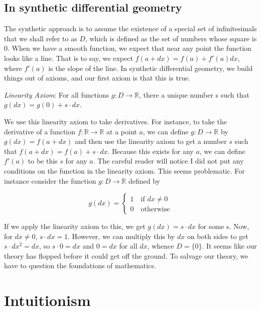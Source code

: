 \documentclass[]{book}
\begin{document}
\hypertarget{in-synthetic-differential-geometry}{%
\subsection{In synthetic differential
geometry}\label{in-synthetic-differential-geometry}}

The synthetic approach is to assume the existence of a special set of infinitesimals that we shall refer to as $D$, which is defined as the set of numbers whose square is 0. When we have a smooth function, we expect that near any point the function looks like a line. That is to say, we expect $f(a + dx) = f(a) + f'(a)dx$, where $f'(a)$ is the slope of the line. In synthetic differential geometry, we build things out of axioms, and our first axiom is that this is true.

\emph{Linearity Axiom}: For all functions $g : D \to \mathbb{R}$,
there a unique number s such that $g(dx) = g(0) + s \cdot dx$.

We use this linearity axiom to take derivatives. For instance, to take the derivative of a function $f: \mathbb{R} \to \mathbb{R}$ at a point $a$, we can define $g : D \to \mathbb{R}$ by $g(dx) = f(a + dx)$ and then use the linearity axiom to get a number $s$ such that $f(a + dx) = f(a) + s \cdot dx$. Because this exists for any $a$, we can define $f'(a)$ to be this $s$ for any $a$. The careful reader will notice I did not put any conditions on the function in the linearity axiom. This seems problematic. For instance consider the function $g : D \to \mathbb{R}$ defined by

\[ g(dx) = \begin{cases} 1 \quad \text{if $dx \neq 0$} \\ 0 \quad \text{otherwise} \end{cases} \]

If we apply the linearity axiom to this, we get $g(dx) = s \cdot dx$ for some s. Now, for $dx \neq 0$, $s \cdot dx = 1$. However, we can multiply this by $dx$ on both sides to get $s \cdot dx^2 = dx$, so $s \cdot 0 = dx$ and $0 = dx$ for all $dx$, whence $D = \{0\}$.  It seems like our theory has flopped before it could get off the ground.  To salvage our theory, we have to question the foundations of mathematics.

\hypertarget{intuitionism}{%
\section{Intuitionism}\label{intuitionism}}
\end{document}
